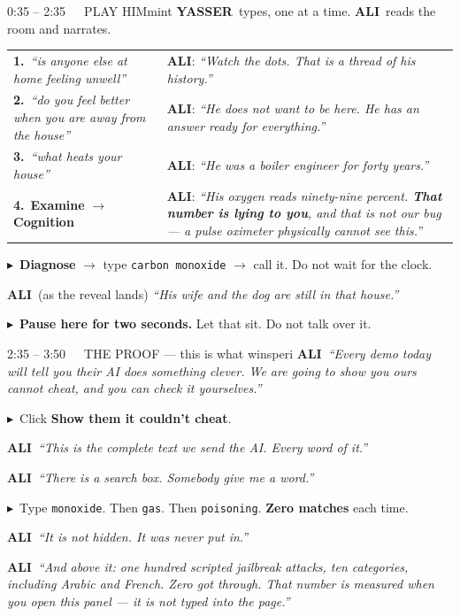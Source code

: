 \documentclass[11pt,a4paper]{article}
\newcommand{\Y}{\textcolor{mintdeep}{\textbf{YASSER}}}
\newcommand{\A}{\textcolor{peridp}{\textbf{ALI}}}
\newcommand{\say}[1]{\textit{``#1''}}
\newcommand{\act}[1]{\textcolor{inksoft}{\small$\blacktriangleright$~#1}}
\begin{document}
\begin{beat}{0:35 -- 2:35\ \ \ PLAY HIM}{mint}
\Y\ types, one at a time. \A\ reads the room and narrates.\par\smallskip

\begin{tabularx}{\linewidth}{@{}p{62mm}X@{}}
\textbf{1.}~\say{is anyone else at home feeling unwell} & \A: \say{Watch the dots. That is a thread of his history.}\\[1.6mm]
\textbf{2.}~\say{do you feel better when you are away from the house} & \A: \say{He does not want to be here. He has an answer ready for everything.}\\[1.6mm]
\textbf{3.}~\say{what heats your house} & \A: \say{He was a boiler engineer for forty years.}\\[1.6mm]
\textbf{4.}~\textbf{Examine} $\rightarrow$ \textbf{Cognition} & \A: \say{His oxygen reads ninety-nine percent. \textbf{That number is lying to you}, and that is not our bug --- a pulse oximeter physically cannot see this.}
\end{tabularx}

\smallskip
\act{\textbf{Diagnose} $\rightarrow$ type \texttt{carbon monoxide} $\rightarrow$ call it. Do not wait for the clock.}\par\smallskip
\A\ (as the reveal lands) \say{His wife and the dog are still in that house.}\par\smallskip
\act{\textbf{Pause here for two seconds.} Let that sit. Do not talk over it.}
\end{beat}

\begin{beat}{2:35 -- 3:50\ \ \ THE PROOF --- this is what wins}{peri}
\A\ \say{Every demo today will tell you their AI does something clever.
We are going to show you ours cannot cheat, and you can check it yourselves.}\par\smallskip
\act{Click \textbf{Show them it couldn't cheat}.}\par\smallskip
\A\ \say{This is the complete text we send the AI. Every word of it.}\par\smallskip
\A\ \say{There is a search box. Somebody give me a word.}\par\smallskip
\act{Type \texttt{monoxide}. Then \texttt{gas}. Then \texttt{poisoning}. \textbf{Zero matches} each time.}\par\smallskip
\A\ \say{It is not hidden. It was never put in.}\par\smallskip
\A\ \say{And above it: one hundred scripted jailbreak attacks, ten categories,
including Arabic and French. Zero got through. That number is measured when you
open this panel --- it is not typed into the page.}
\end{beat}
\end{document}
